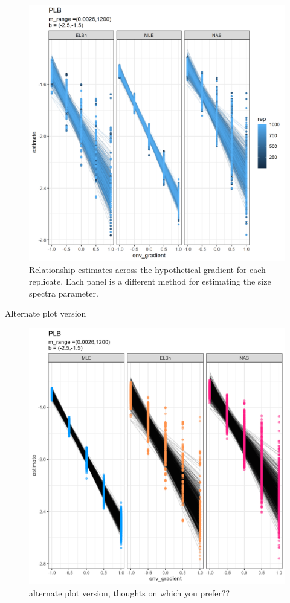 \documentclass[
]{article}
\begin{document}
\begin{figure}
\centering
\includegraphics{figures/PLB_sim_main.png}
\caption{Relationship estimates across the hypothetical gradient for
each replicate. Each panel is a different method for estimating the size
spectra parameter.}
\end{figure}

Alternate plot version

\begin{figure}
\centering
\includegraphics{figures/PLB_main_v2.png}
\caption{alternate plot version, thoughts on which you prefer??}
\end{figure}
\end{document}
